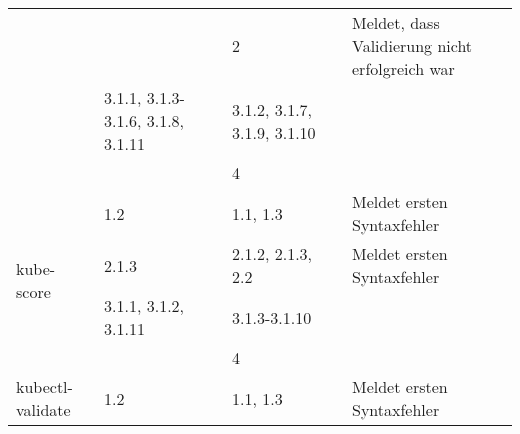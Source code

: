 \begin{table}[htp]
\begin{tabularx}{\columnwidth}{lXXl}
                                                                                  &                                                                             & 2                                                                                           & Meldet, dass Validierung nicht erfolgreich war          \\
                                                                                  & 3.1.1, 3.1.3{-}3.1.6, 3.1.8, 3.1.11                                         & 3.1.2, 3.1.7, 3.1.9, 3.1.10                                                                 &                                                         \\
                                                                                  &                                                                             & 4                                                                                           &                                                         \\
    \midrule
    \multirow{4}{*}{kube-score}                                                   & 1.2                                                                         & 1.1, 1.3                                                                                    & Meldet ersten Syntaxfehler                              \\
                                                                                  & 2.1.3                                                                       & 2.1.2, 2.1.3, 2.2                                                                           & Meldet ersten Syntaxfehler                              \\
                                                                                  & 3.1.1, 3.1.2, 3.1.11                                                        & 3.1.3{-}3.1.10                                                                              &                                                         \\
                                                                                  &                                                                             & 4                                                                                           &                                                         \\
    \midrule
    \multirow{4}{*}{kubectl-validate}                                             & 1.2                                                                         & 1.1, 1.3                                                                                    & Meldet ersten Syntaxfehler                              \\

\end{tabularx}
\end{table}
